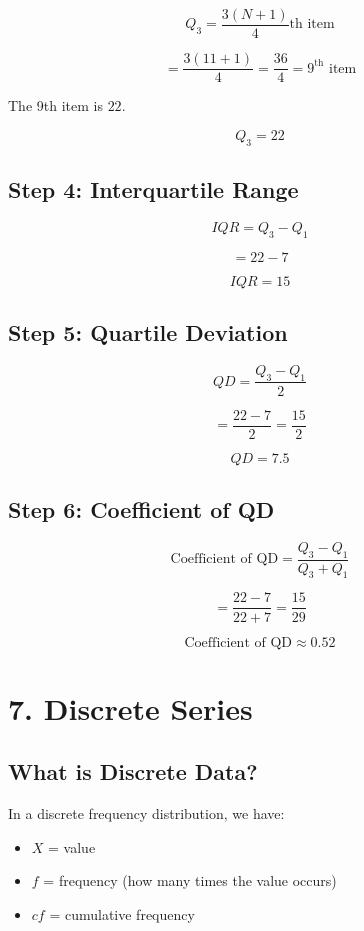 \documentclass[12pt,a4paper]{article}
\begin{document}
\[
Q_3=\frac{3(N+1)}{4}\text{th item}
\]

\[
=\frac{3(11+1)}{4}
=\frac{36}{4}
=9^{\text{th}}\text{ item}
\]

The 9th item is $22$.

\[
\boxed{Q_3=22}
\]

\subsection*{Step 4: Interquartile Range}

\[
IQR=Q_3-Q_1
\]

\[
=22-7
\]

\[
\boxed{IQR=15}
\]

\subsection*{Step 5: Quartile Deviation}

\[
QD=\frac{Q_3-Q_1}{2}
\]

\[
=\frac{22-7}{2}
=\frac{15}{2}
\]

\[
\boxed{QD=7.5}
\]

\subsection*{Step 6: Coefficient of QD}

\[
\text{Coefficient of QD}
=
\frac{Q_3-Q_1}{Q_3+Q_1}
\]

\[
=
\frac{22-7}{22+7}
=
\frac{15}{29}
\]

\[
\boxed{\text{Coefficient of QD}\approx0.52}
\]

\section{7. Discrete Series}

\subsection*{What is Discrete Data?}

In a discrete frequency distribution, we have:

\begin{itemize}
    \item $X$ = value
    \item $f$ = frequency (how many times the value occurs)
    \item $cf$ = cumulative frequency
\end{itemize}
\end{document}
